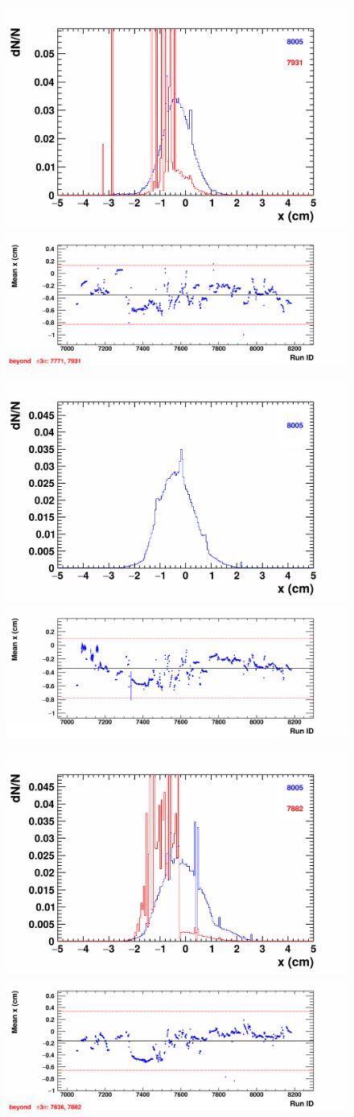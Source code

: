     \begin{figure}[H]
        \begin{center}
            \includegraphics[width=0.35\linewidth]{../pict/QA_RunByRun_24.12/H1/nVtxTr_h2_RunId_beam_hit_x_st0.png}
            \includegraphics[width=0.60\linewidth]{../pict/QA_RunByRun_24.12/nVtxTr_h2_RunId_beam_hit_x_st0.png}

            \includegraphics[width=0.35\linewidth]{../pict/QA_RunByRun_24.12/H1/nVtxTr_h2_RunId_beam_hit_x_st1.png}
            \includegraphics[width=0.60\linewidth]{../pict/QA_RunByRun_24.12/nVtxTr_h2_RunId_beam_hit_x_st1.png}

            \includegraphics[width=0.35\linewidth]{../pict/QA_RunByRun_24.12/H1/nVtxTr_h2_RunId_beam_hit_x_st2.png}
            \includegraphics[width=0.60\linewidth]{../pict/QA_RunByRun_24.12/nVtxTr_h2_RunId_beam_hit_x_st2.png}


\end{center}
\end{figure}
